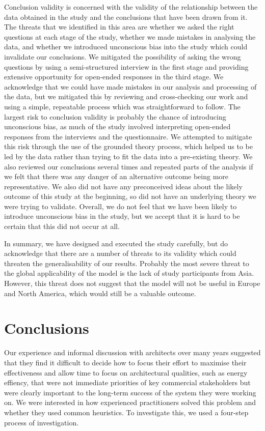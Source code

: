 Conclusion validity is concerned with the validity of the relationship between the data obtained in the study and the conclusions that have been drawn from it.  The threats that we identified in this area are whether we asked the right questions at each stage of the study, whether we made mistakes in analysing the data, and whether we introduced unconscious bias into the study which could invalidate our conclusions.  We mitigated the possibility of asking the wrong questions by using a semi-structured interview in the first stage and providing extensive opportunity for open-ended responses in the third stage.  We acknowledge that we could have made mistakes in our analysis and processing of the data, but we mitigated this by reviewing and cross-checking our work and using a simple, repeatable process which was straightforward to follow.  The largest risk to conclusion validity is probably the chance of introducing unconscious bias, as much of the study involved interpreting open-ended responses from the interviews and the questionnaire.  We attempted to mitigate this risk through the use of the grounded theory process, which helped us to be led by the data rather than trying to fit the data into a pre-existing theory.  We also reviewed our conclusions several times and repeated parts of the analysis if we felt that there was any danger of an alternative outcome being more representative.  We also did not have any preconceived ideas about the likely outcome of this study at the beginning, so did not have an underlying theory we were trying to validate.  Overall, we do not feel that we have been likely to introduce unconscious bias in the study, but we accept that it is hard to be certain that this did not occur at all.

In summary, we have designed and executed the study carefully, but do acknowledge that there are a number of threats to its validity which could threaten the generalisability of our results.  Probably the most severe threat to the global applicability of the model is the lack of study participants from Asia.  However, this threat does not suggest that the model will not be useful in Europe and North America, which would still be a valuable outcome.

\section{Conclusions}
\label{sec:prioritisation-conclusions}

Our experience and informal discussion with architects over many years suggested that they find it difficult to decide how to focus their effort to maximise their effectiveness and allow time to focus on architectural qualities, such as energy effiency, that were not immediate priorities of key commercial stakeholders but were clearly important to the long-term success of the system they were working on.  We were interested in how experienced practitioners solved this problem and whether they used common heuristics.  To investigate this, we used a four-step process of investigation.

